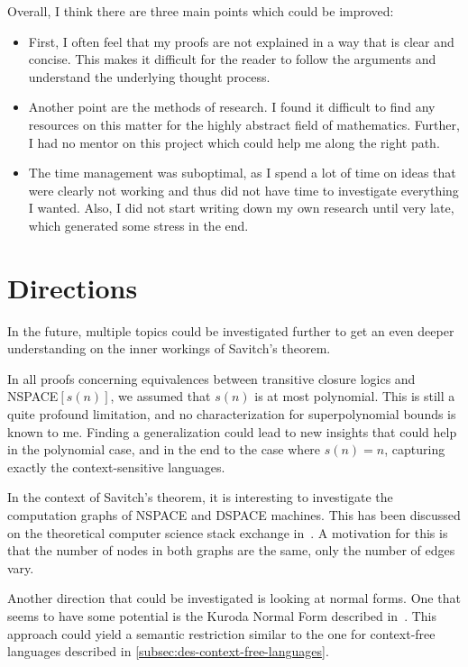 Overall, I think there are three main points which could be improved:
\begin{itemize}
    \setlength\itemsep{0.2em}
    \item First, I often feel that my proofs are not explained in a way that is clear and concise.
    This makes it difficult for the reader to follow the arguments and understand the underlying thought process.
    \item Another point are the methods of research.
    I found it difficult to find any resources on this matter for the highly abstract field of mathematics.
    Further, I had no mentor on this project which could help me along the right path.
    \item The time management was suboptimal, as I spend a lot of time on ideas that were clearly not working and thus did not have time to investigate everything I wanted.
    Also, I did not start writing down my own research until very late, which generated some stress in the end.
\end{itemize}

\section{Directions}\label{sec:directions}
In the future, multiple topics could be investigated further to get an even deeper understanding on the inner workings of Savitch's theorem.

In all proofs concerning equivalences between transitive closure logics and NSPACE$[s(n)]$, we assumed that $s(n)$ is at most polynomial.
This is still a quite profound limitation, and no characterization for superpolynomial bounds is known to me.
Finding a generalization could lead to new insights that could help in the polynomial case, and in the end to the case where $s(n) = n$, capturing exactly the context-sensitive languages.

In the context of Savitch's theorem, it is interesting to investigate the computation graphs of NSPACE and DSPACE machines.
This has been discussed on the theoretical computer science stack exchange in~\cite{Barak2010}.
A motivation for this is that the number of nodes in both graphs are the same, only the number of edges vary.

Another direction that could be investigated is looking at normal forms.
One that seems to have some potential is the Kuroda Normal Form described in~\cite{Kuroda1964}.
This approach could yield a semantic restriction similar to the one for context-free languages described in \cref{subsec:des-context-free-languages}.

